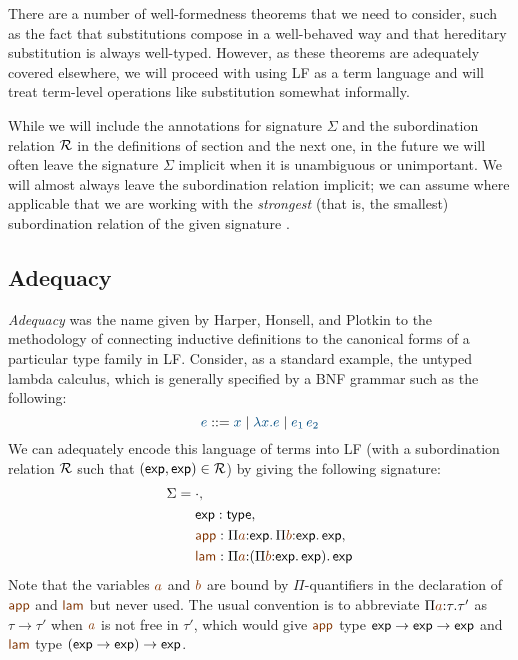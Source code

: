There are a number of well-formedness theorems that we need to
consider, such as the fact that substitutions compose in a
well-behaved way and that hereditary substitution is always
well-typed.  However, as these theorems are adequately covered
elsewhere, we will proceed with using LF as a term language and will 
treat term-level operations like substitution somewhat informally.

While we will include the annotations for signature $\Sigma$
and the subordination relation $\mathcal R$ in the definitions of section
and the next one, in the future we will often leave the signature
$\Sigma$ implicit when it is unambiguous or unimportant. We will
almost always leave the subordination relation implicit; we can assume
where applicable that we are working with the {\it strongest} (that
is, the smallest) subordination relation of the given signature
\cite{harper07mechanizing}.

\subsection{Adequacy}
\label{sec:lf-adequacy}

{\it Adequacy} was the name given by Harper, Honsell, and Plotkin to
the methodology of connecting inductive definitions to the canonical
forms of a particular type family in LF. Consider, as a standard
example, the untyped lambda calculus, which is generally specified by
a BNF grammar such as the following:
\[
\obj{e} ::= \obj{x} \mid \obj{\lambda x.e} \mid \obj{e_1\,e_2}
\]
We can adequately encode this language of terms into LF (with a
subordination relation $\mathcal R$ such that $({\sf exp}, {\sf
  exp}) \in \mathcal R$) by giving the following signature:
\begin{align*}
\Sigma & = \cdot, 
\\
 & ~\quad {\sf exp} : {\sf type}, 
\\
 & ~\quad \lf{\sf app} : 
     \lfpi{a}{{\sf exp}}{\,\lfpi{b}{\sf exp}{\,\sf exp}},
\\
 & ~\quad \lf{\sf lam} : 
     \lfpi{a}{(\lfpi{b}{\sf exp}{\,\sf exp})}{\,\sf exp}
\end{align*}
Note that the variables $\lf{a}$ and $\lf{b}$ are bound by
$\Pi$-quantifiers in the declaration of $\lf{\sf app}$ and $\lf{\sf lam}$ but
never used. The usual convention is to abbreviate
$\lfpi{a}{\tau}{\tau'}$ as $\tau \rightarrow \tau'$ when $\lf{a}$ is
not free in $\tau'$, which would give $\lf{\sf app}$ type ${\sf exp}
\rightarrow {\sf exp} \rightarrow {\sf exp}$ and $\lf{\sf lam}$ type
$({\sf exp} \rightarrow {\sf exp}) \rightarrow {\sf exp}$.

